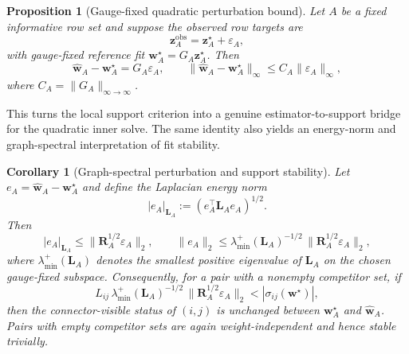 \documentclass[preprint,12pt]{elsarticle}
\newtheorem{proposition}{Proposition}
\newtheorem{corollary}{Corollary}
\newcommand{\weights}{\mathbf{w}}
\newcommand{\lap}{\mathbf{L}}
\begin{document}
\begin{proposition}[Gauge-fixed quadratic perturbation bound]
\label{prop:quadratic_fit_perturbation}
Let $A$ be a fixed informative row set and suppose the observed row targets are
\begin{equation}
    \mathbf{z}^{\mathrm{obs}}_A = \mathbf{z}^{\star}_A + \varepsilon_A,
\end{equation}
with gauge-fixed reference fit $\weights_A^\star = G_A\mathbf{z}^{\star}_A$.
Then
\begin{equation}
    \widehat{\weights}_A-\weights_A^\star = G_A\varepsilon_A,
    \qquad
    \lVert \widehat{\weights}_A-\weights_A^\star\rVert_\infty
    \le C_A\lVert \varepsilon_A\rVert_\infty,
\end{equation}
where $C_A=\lVert G_A\rVert_{\infty\to\infty}$.
\end{proposition}

This turns the local support criterion into a genuine estimator-to-support
bridge for the quadratic inner solve. The same identity also yields an
energy-norm and graph-spectral interpretation of fit stability.

\begin{corollary}[Graph-spectral perturbation and support stability]
\label{cor:quadratic_fit_spectral}
Let $e_A=\widehat{\weights}_A-\weights_A^\star$ and define the Laplacian
energy norm
\begin{equation}
    |e_A|_{\lap_A}:=(e_A^\top \lap_A e_A)^{1/2}.
\end{equation}
Then
\begin{equation}
    |e_A|_{\lap_A}
    \le \lVert \mathbf{R}_A^{1/2}\varepsilon_A\rVert_2,
    \qquad
    \lVert e_A\rVert_2
    \le \lambda_{\min}^+(\lap_A)^{-1/2}\,\lVert \mathbf{R}_A^{1/2}\varepsilon_A\rVert_2,
\end{equation}
where $\lambda_{\min}^+(\lap_A)$ denotes the smallest positive eigenvalue of
$\lap_A$ on the chosen gauge-fixed subspace. Consequently, for a pair with a
nonempty competitor set, if
\begin{equation}
    L_{ij}\,\lambda_{\min}^+(\lap_A)^{-1/2}\,\lVert \mathbf{R}_A^{1/2}\varepsilon_A\rVert_2
    < |\sigma_{ij}(\weights^\star)|,
\end{equation}
then the connector-visible status of $(i,j)$ is unchanged between
$\weights_A^\star$ and $\widehat{\weights}_A$. Pairs with empty competitor sets
are again weight-independent and hence stable trivially.
\end{corollary}
\end{document}
